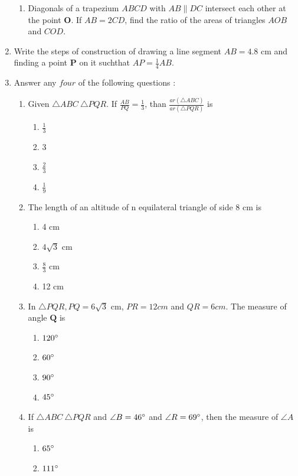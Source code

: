\documentclass{article}
\let\vec\mathbf
\begin{document}
\begin{enumerate}
\begin{enumerate}
			\item Diagonals of a trapezium $ ABCD $ with $ AB \parallel DC $ intersect each other at 
				the point $ \vec{O} $. If $ AB =2 CD $, find the ratio of the areas of triangles 
				$ AOB $ and $ COD $. 
		\end{enumerate}
	\item Write the steps of construction of drawing a line segment $ AB = 4.8 $ cm and finding a point 
		$ \vec{P} $ on it suchthat $ AP = \frac{1}{4} AB $. 
	\item Answer any $ four $ of the following questions : 
		\begin{enumerate}
		\item Given $ \triangle ABC ~ \triangle PQR $. If $ \frac{AB}{PQ} = \frac{1}{3} $, than 
			$ \frac{ar(\triangle ABC)}{ar(\triangle PQR)} $ is
			\begin{enumerate}
			\item $ \frac{1}{3} $
			\item 3
			\item $ \frac{2}{3} $
			\item $ \frac{1}{9} $
			\end{enumerate}
		\item The length of an altitude of n equilateral triangle of side 8 cm is
			\begin{enumerate}
				\item 4 cm
				\item $ 4\sqrt{3} $ cm
				\item $ \frac{8}{3} $ cm
				\item 12 cm
			\end{enumerate}
		\item In $ \triangle PQR, PQ = 6 \sqrt{3} $ cm, $ PR = 12 cm $ and $ QR = 6 cm $. The measure of 
			angle $ \vec{Q} $ is
			\begin{enumerate}
		\item $ 120{\degree} $
		\item $ 60{\degree} $
		\item $ 90{\degree} $
		\item $ 45{\degree} $
			\end{enumerate}
		\item If $ \triangle ABC ~ \triangle PQR $ and $ \angle{B} =46{\degree} $ and $ \angle{R} = 
			69{\degree} $, then the measure of $ \angle{A} $ is
				\begin{enumerate}
					\item $ 65{\degree} $
					\item $ 111{\degree} $

\end{enumerate}
\end{enumerate}
\end{enumerate}
\end{document}
